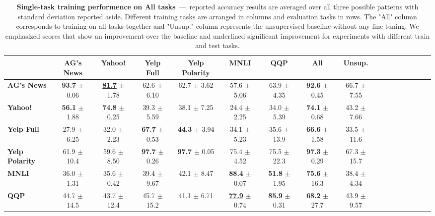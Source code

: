 \begin{table*}[h]
	\centering
	\fontsize{9}{13}
	\selectfont
	\begin{tabular*}{\textwidth}{l@{\extracolsep{\fill}}cccccccccccccccc}
		\toprule
		& \textbf{AG's News}    & \textbf{Yahoo!}    & \textbf{Yelp Full}    & \textbf{Yelp Polarity}    & \textbf{MNLI}    & \textbf{QQP}    & \textbf{All}    & \textbf{Unsup.}    \\ \hline
		\textbf{AG's News}        & \textbf{93.7}   \tiny$\pm$ 0.06      & \textbf{\underline{81.7}}   \tiny$\pm$ 1.78      & 62.6      \tiny$\pm$ 6.10      & 62.7          \tiny$\pm$ 3.62      & 57.6 \tiny$\pm$ 5.06      & 63.9 \tiny$\pm$ 4.35      & \textbf{92.6} \tiny$\pm$ 0.45      & 66.7   \tiny$\pm$ 7.55      \\
		\textbf{Yahoo!}         & \textbf{56.1}    \tiny$\pm$ 1.88      & \textbf{74.8}   \tiny$\pm$ 0.25      & 39.3       \tiny$\pm$ 5.59      & 38.1           \tiny$\pm$ 7.25      & 24.4  \tiny$\pm$ 2.25      & 34.0 \tiny$\pm$ 5.39      & \textbf{74.1} \tiny$\pm$ 0.68      & 43.2   \tiny$\pm$ 7.66      \\
		\textbf{Yelp Full}     & 27.9    \tiny$\pm$ 6.25      & 32.0   \tiny$\pm$ 2.23      & \textbf{67.7}       \tiny$\pm$ 0.53      & \textbf{44.3}           \tiny$\pm$ 3.94      & 34.1  \tiny$\pm$ 5.23      & 35.6 \tiny$\pm$ 13.9      & \textbf{66.6} \tiny$\pm$ 1.58      & 33.5   \tiny$\pm$ 11.6      \\
		\textbf{Yelp Polarity} & 61.9    \tiny$\pm$ 10.4      & 59.6   \tiny$\pm$ 8.50      & \textbf{97.7}       \tiny$\pm$ 0.26      & \textbf{97.7}           \tiny$\pm$ 0.05      & 75.4  \tiny$\pm$ 4.52      & 75.5 \tiny$\pm$ 22.3      & \textbf{97.3} \tiny$\pm$ 0.29      & 67.3   \tiny$\pm$ 15.7      \\
		\textbf{MNLI}          & 36.0    \tiny$\pm$ 1.31      & 35.6   \tiny$\pm$ 0.42      & 39.4       \tiny$\pm$ 9.67      & 42.1           \tiny$\pm$ 8.47      & \textbf{88.4}  \tiny$\pm$ 0.07      & \textbf{51.8} \tiny$\pm$ 1.95      & \textbf{75.6} \tiny$\pm$ 16.3      & 38.4   \tiny$\pm$ 4.34      \\
		\textbf{QQP}           & 44.7    \tiny$\pm$ 14.5      & 43.7   \tiny$\pm$ 12.4      & 45.7       \tiny$\pm$ 15.2      & 41.1           \tiny$\pm$ 6.71      & \textbf{\underline{77.9}}  \tiny$\pm$ 0.74      & \textbf{85.9} \tiny$\pm$ 0.31      & \textbf{68.2} \tiny$\pm$ 27.7      & 43.9   \tiny$\pm$ 9.57      \\ \bottomrule
	\end{tabular*}
	\caption{\textbf{Single-task training performence on All tasks}~---~reported accuracy results are averaged over all three possible patterns with standard deviation reported aside. Different training tasks are arranged in columns and evaluation tasks in rows. The "All" column corresponds to training on all tasks together and "Unsup." column represents the unsupervised baseline without any fine-tuning. We emphasized scores that show an improvement over the baseline and underlined significant improvement for experiments with different train and test tasks.}\label{tab:single-on-train-set-summary}
	\vspace{-4mm}
\end{table*}
